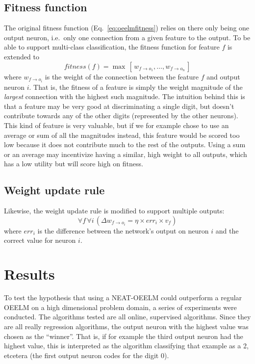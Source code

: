 \documentclass[a4paper]{article}
\numberwithin{equation}{section}
\begin{document}
\subsection{Fitness function}
The original fitness function (Eq.~\ref{eq:oeelmfitness}) relies on there only
being one output neuron, i.e.\ only one connection from a given feature to the
output. To be able to support multi-class classification, the fitness function
for feature $f$ is extended to
\begin{equation}
    fitness(f) = \max \,[\,w_{f \rightarrow o_1},\ldots,w_{f \rightarrow o_n}\,]
    \label{eq:oeelmfitness2}
\end{equation}
where $w_{f \rightarrow o_i}$ is the weight of the connection between the
feature $f$ and output neuron $i$. That is, the fitness of a feature is simply
the weight magnitude of the \emph{largest} connection with the highest such
magnitude. The intuition behind this is that a feature may be very good at
discriminating a single digit, but doesn't contribute towards any of the other
digits (represented by the other neurons). This kind of feature is very
valuable, but if we for example chose to use an average or sum of all the
magnitudes instead, this feature would be scored too low because it does not
contribute much to the rest of the outputs. Using a sum or an average may
incentivize having a similar, high weight to all outputs, which has a low
utility but will score high on fitness.

\subsection{Weight update rule}
Likewise, the weight update rule is modified to support multiple outputs:
\begin{equation}
    \forall f \, \forall i \,(\Delta w_{f \rightarrow o_i} = \eta \times err_i
    \times v_f)
    \label{eq:oeelmdeltaw2}
\end{equation}
where $err_i$ is the difference between the network's output on neuron $i$ and
the correct value for neuron $i$.

\section{Results}
To test the hypothesis that using a NEAT-OEELM could outperform a regular OEELM
on a high dimensional problem domain, a series of experiments were conducted.
The algorithms tested are all online, supervised algorithms. Since they are all
really regression algorithms, the output neuron with the highest value was
chosen as the ``winner''. That is, if for example the third output neuron had
the highest value, this is interpreted as the algorithm classifying that
example as a 2, etcetera (the first output neuron codes for the digit 0).
\end{document}
